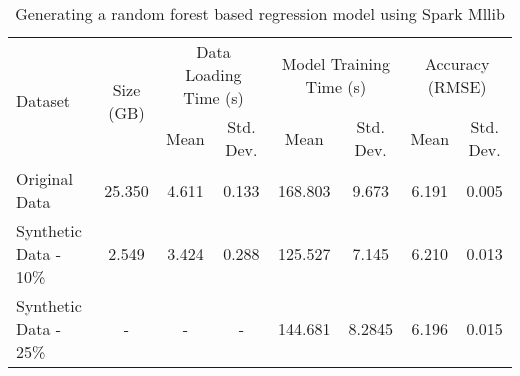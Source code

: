 \begin{table*}
    \renewcommand{\arraystretch}{1.3}
    \caption{Generating a random forest based regression model using Spark Mllib}
    \label{tab:resource-util}
    \begin{center}
        \begin{tabularx}{0.98\textwidth}{|X|c|c|c|c|c|c|c|}
            \hline
            \multirow{2}{*}{Dataset} & \multirow{2}{*}{Size (GB)} & \multicolumn{2}{c|}{\cellcolor[gray]{0.7}Data Loading Time (s)} &\multicolumn{2}{c|}{\cellcolor[gray]{0.7}Model Training Time (s)} & \multicolumn{2}{c|}{\cellcolor[gray]{0.7}Accuracy (RMSE)}\\
            \cline{3-8}
             & & \cellcolor[gray]{0.9}Mean & \cellcolor[gray]{0.9}Std. Dev.  &  \cellcolor[gray]{0.9}Mean & \cellcolor[gray]{0.9}Std. Dev. &  \cellcolor[gray]{0.9}Mean & \cellcolor[gray]{0.9}Std. Dev. \\
            \hline
            Original Data & 25.350 & 4.611 & 0.133 & 168.803 & 9.673 & 6.191 & 0.005 \\
            \hline
            Synthetic Data - 10\% & 2.549 & 3.424 & 0.288 & 125.527 & 7.145 & 6.210 & 0.013 \\
            \hline
            Synthetic Data - 25\% & - & - & - & 144.681 & 8.2845 & 6.196 & 0.015 \\
            \hline
		\end{tabularx}
	\end{center}
\end{table*}
